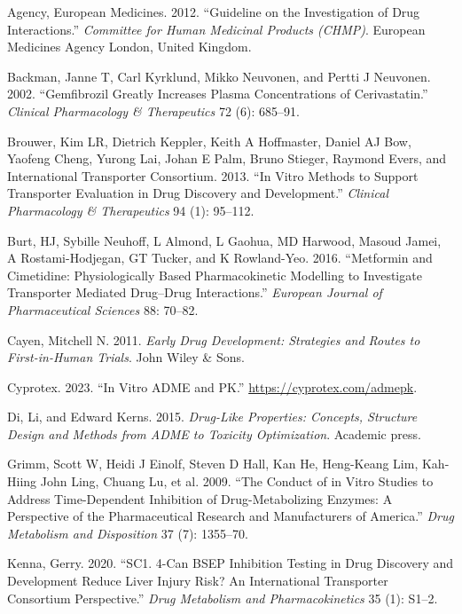 \documentclass[
  11pt,
  krantz2, a4paper, twoside]{krantz}
\newlength{\cslhangindent}
\newenvironment{CSLReferences}[2] %
 {\begin{list}{}{%
  \setlength{\itemindent}{0pt}
  \setlength{\leftmargin}{0pt}
  \setlength{\parsep}{0pt}
  \ifodd #1
   \setlength{\leftmargin}{\cslhangindent}
   \setlength{\itemindent}{-1\cslhangindent}
  \fi
  \setlength{\itemsep}{#2\baselineskip}}}
 {\end{list}}
\begin{document}
\label{refs}
\begin{CSLReferences}{1}{0}
Agency, European Medicines. 2012. {``Guideline on the Investigation of Drug Interactions.''} \emph{Committee for Human Medicinal Products (CHMP)}. European Medicines Agency London, United Kingdom.

Backman, Janne T, Carl Kyrklund, Mikko Neuvonen, and Pertti J Neuvonen. 2002. {``Gemfibrozil Greatly Increases Plasma Concentrations of Cerivastatin.''} \emph{Clinical Pharmacology \& Therapeutics} 72 (6): 685--91.

Brouwer, Kim LR, Dietrich Keppler, Keith A Hoffmaster, Daniel AJ Bow, Yaofeng Cheng, Yurong Lai, Johan E Palm, Bruno Stieger, Raymond Evers, and International Transporter Consortium. 2013. {``In Vitro Methods to Support Transporter Evaluation in Drug Discovery and Development.''} \emph{Clinical Pharmacology \& Therapeutics} 94 (1): 95--112.

Burt, HJ, Sybille Neuhoff, L Almond, L Gaohua, MD Harwood, Masoud Jamei, A Rostami-Hodjegan, GT Tucker, and K Rowland-Yeo. 2016. {``Metformin and Cimetidine: Physiologically Based Pharmacokinetic Modelling to Investigate Transporter Mediated Drug--Drug Interactions.''} \emph{European Journal of Pharmaceutical Sciences} 88: 70--82.

Cayen, Mitchell N. 2011. \emph{Early Drug Development: Strategies and Routes to First-in-Human Trials}. John Wiley \& Sons.

Cyprotex. 2023. {``In Vitro ADME and PK.''} \url{https://cyprotex.com/admepk}.

Di, Li, and Edward Kerns. 2015. \emph{Drug-Like Properties: Concepts, Structure Design and Methods from ADME to Toxicity Optimization}. Academic press.

Grimm, Scott W, Heidi J Einolf, Steven D Hall, Kan He, Heng-Keang Lim, Kah-Hiing John Ling, Chuang Lu, et al. 2009. {``The Conduct of in Vitro Studies to Address Time-Dependent Inhibition of Drug-Metabolizing Enzymes: A Perspective of the Pharmaceutical Research and Manufacturers of America.''} \emph{Drug Metabolism and Disposition} 37 (7): 1355--70.

Kenna, Gerry. 2020. {``SC1. 4-Can BSEP Inhibition Testing in Drug Discovery and Development Reduce Liver Injury Risk? An International Transporter Consortium Perspective.''} \emph{Drug Metabolism and Pharmacokinetics} 35 (1): S1--2.


\end{CSLReferences}
\end{document}

